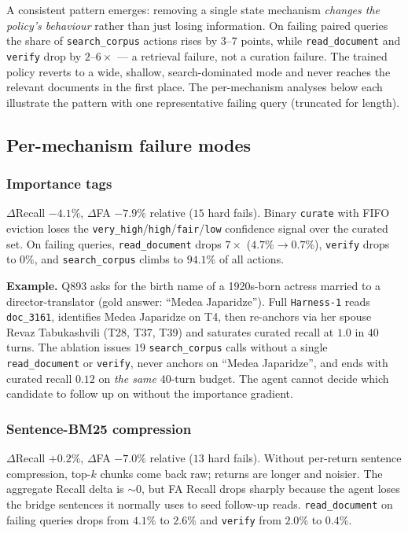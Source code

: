 \documentclass{article}
\newcommand{\sys}{\texttt{Harness-1}\xspace}
\newcommand{\verify}{\texttt{verify}\xspace}
\newcommand{\curate}{\texttt{curate}\xspace}
\begin{document}
A consistent pattern emerges: removing a single state mechanism
\emph{changes the policy's behaviour} rather than just losing
information. On failing paired queries the share of
\texttt{search\_corpus} actions rises by $3$--$7$ points, while
\texttt{read\_document} and \verify drop by $2$--$6\times$ ---
a retrieval failure, not a curation failure. The trained
policy reverts to a wide, shallow, search-dominated mode and
never reaches the relevant documents in the first place. The
per-mechanism analyses below each illustrate the pattern with
one representative failing query (truncated for length).

\subsection{Per-mechanism failure modes}

\subsubsection{Importance tags}
\label{app:err:importance-tags}
$\Delta$Recall $-4.1\%$, $\Delta$FA $-7.9\%$ relative
($15$ hard fails).
Binary \curate with FIFO eviction loses the
\texttt{very\_high}/\texttt{high}/\texttt{fair}/\texttt{low}
confidence signal over the curated set. On failing queries,
\texttt{read\_document} drops $7\times$ ($4.7\%{\to}0.7\%$),
\verify drops to $0\%$, and \texttt{search\_corpus} climbs to
$94.1\%$ of all actions.

\textbf{Example.} Q893 asks for the birth name of a 1920s-born
actress married to a director-translator
(gold answer: ``Medea Japaridze''). Full \sys reads
\texttt{doc\_3161}, identifies Medea Japaridze on T4, then
re-anchors via her spouse Revaz Tabukashvili (T28, T37, T39)
and saturates curated recall at $1.0$ in $40$ turns. The
ablation issues $19$ \texttt{search\_corpus} calls without a
single \texttt{read\_document} or \verify, never anchors on
``Medea Japaridze'', and ends with curated recall $0.12$ on
\emph{the same} $40$-turn budget. The agent cannot decide which
candidate to follow up on without the importance gradient.

\subsubsection{Sentence-BM25 compression}
\label{app:err:sentence-compress}
$\Delta$Recall $+0.2\%$, $\Delta$FA $-7.0\%$ relative
($13$ hard fails).
Without per-return sentence compression, top-$k$ chunks come
back raw; returns are longer and noisier. The aggregate Recall
delta is $\sim$$0$, but FA Recall drops sharply because the
agent loses the bridge sentences it normally uses to seed
follow-up reads. \texttt{read\_document} on failing queries
drops from $4.1\%$ to $2.6\%$ and \verify from $2.0\%$ to
$0.4\%$.
\end{document}
